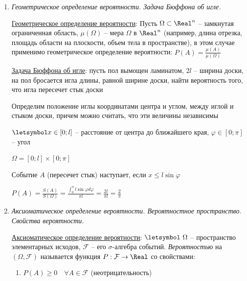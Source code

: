 \begin{enumerate}
    \hyperlink{classicdefinitionofprobability}{Классическое определение вероятности}: Пусть пространство случайных событий $\Omega$ содержит конечное число равновозможных исходов,
    тогда применимо классическое определение вероятности: , где $n$ -- число всех возможных исходов, $m$ -- число благоприятных исходов

    \item \textit{Геометрическое определение вероятности. Задача Бюффона об игле.}

    \hyperlink{geometricdefinitionofprobability}{Геометрическое определение вероятности}: Пусть $\Omega \subset \Real^n$ -- замкнутая ограниченная область,
    $\mu(\Omega)$ -- мера $\Omega$ в $\Real^n$ (например, длина отрезка, площадь области на плоскости, объем тела в пространстве), в этом случае применимо геометрическое определение вероятности: $P(A) = \frac{\mu(A)}{\mu(\Omega)}$

    \hyperlink{buffonsproblem}{Задача Бюффона об игле}: пусть пол вымощен ламинатом, $2l$ -- ширина доски, на пол бросается игла длины, равной ширине доски,
    найти вероятность того, что игла пересечет стык доски

    Определим положение иглы координатами центра и углом, между иглой и стыком доски, причем можно считать, что эти величины независимы

    $\letsymbol x \in [0; l]$ -- расстояние от центра до ближайшего края, $\varphi \in [0; \pi]$ -- угол

    $\Omega = [0; l] \times [0; \pi]$

    Событие $A$ (пересечет стык) наступает, если $x \leq l \sin \varphi$

    $P(A) = \frac{S(A)}{S(\Omega)} = \frac{\int_0^\pi l \sin \varphi d \varphi}{\pi l} = \frac{2l}{\pi l} = \frac{2}{\pi}$

    \item \textit{Аксиоматическое определение вероятности. Вероятностное пространство. Свойства вероятности.}

    \hyperlink{axiomaticdefinitionofprobability}{Аксиоматическое определение вероятности}: $\letsymbol\ \Omega$ -- пространство элементарных исходов, $\mathcal{F}$ -- его $\sigma$-алгебра событий.
    \textit{Вероятностью} на $(\Omega, \mathcal{F})$ называется функция $P: \mathcal{F} \to \Real$ со свойствами:

    \begin{enumerate}
        \item $P(A) \geq 0 \quad \forall A \in \mathcal{F}$ (неотрицательность)


\end{enumerate}
\end{enumerate}
